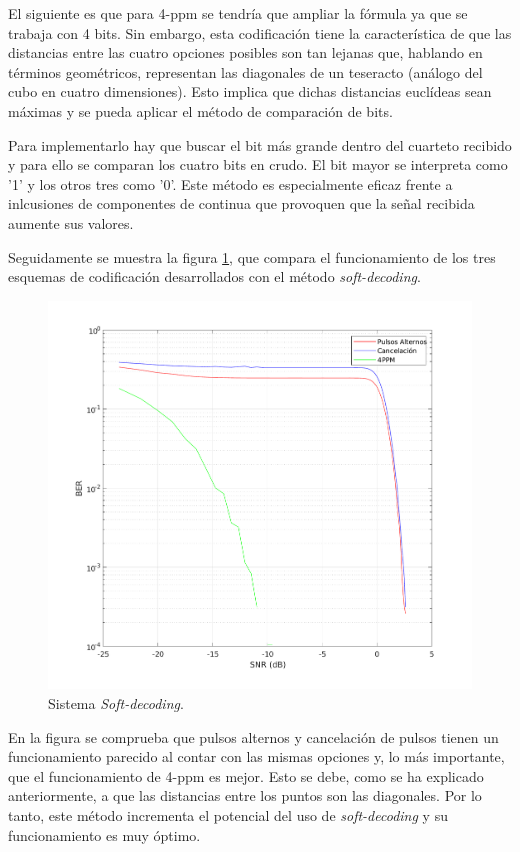 El siguiente es que para 4-ppm se tendría que ampliar la fórmula ya que se trabaja
con 4 bits. Sin embargo, esta codificación tiene la característica de que las distancias
entre las cuatro opciones posibles son tan lejanas que,
hablando en términos geométricos, representan las diagonales
de un teseracto (análogo del cubo en cuatro dimensiones). Esto implica que dichas 
distancias euclídeas sean máximas y se pueda aplicar el método de comparación de bits.

Para implementarlo hay que buscar el bit más grande dentro del cuarteto
recibido y para ello se comparan los cuatro bits en crudo. El bit mayor se interpreta 
como '1' y los otros tres como '0'. Este método es especialmente eficaz frente a 
inlcusiones de componentes de continua que provoquen que la señal recibida aumente sus 
valores.

Seguidamente se muestra la figura \ref{soft-decoding}, que compara el funcionamiento de 
los tres esquemas de codificación desarrollados con el método \textit{soft-decoding}.

\begin{figure}[ht]
    \centering
    \includegraphics[scale=0.5]{./figuras/Soft.pdf}
    \caption{\small{Sistema \textit{Soft-decoding}.}}
    \label{soft-decoding}%
\end{figure}

En la figura se comprueba que pulsos alternos y cancelación de pulsos tienen un 
funcionamiento parecido al contar con las mismas opciones y, lo más importante, que
el funcionamiento de 4-ppm es mejor. Esto se debe, como se ha explicado anteriormente,
a que las distancias entre los puntos son las diagonales. Por lo tanto,
este método incrementa el potencial del 
uso de \textit{soft-decoding} y su funcionamiento es muy óptimo. 


